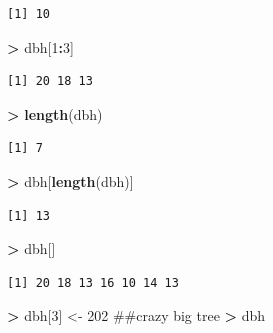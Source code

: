 \documentclass[]{krantz}
\makeatletter
\newenvironment{Shaded}{\begin{snugshade}}{\end{snugshade}}
\newcommand{\KeywordTok}[1]{\textcolor[rgb]{0.27,0.27,0.27}{\textbf{#1}}}
\newcommand{\DecValTok}[1]{\textcolor[rgb]{0.06,0.06,0.06}{#1}}
\newcommand{\StringTok}[1]{\textcolor[rgb]{0.5,0.5,0.5}{#1}}
\newcommand{\OperatorTok}[1]{\textcolor[rgb]{0.43,0.43,0.43}{\textbf{#1}}}
\newcommand{\NormalTok}[1]{#1}
\newenvironment{kframe}{%
\medskip{}
\setlength{\fboxsep}{.8em}
 \def\at@end@of@kframe{}%
 \ifinner\ifhmode%
  \def\at@end@of@kframe{\end{minipage}}%
  \begin{minipage}{\columnwidth}%
 \fi\fi%
 \def\FrameCommand##1{\hskip\@totalleftmargin \hskip-\fboxsep
 \colorbox{shadecolor}{##1}\hskip-\fboxsep
     \hskip-\linewidth \hskip-\@totalleftmargin \hskip\columnwidth}%
 \MakeFramed {\advance\hsize-\width
   \@totalleftmargin\z@ \linewidth\hsize
   \@setminipage}}%
 {\par\unskip\endMakeFramed%
 \at@end@of@kframe}
\renewenvironment{Shaded}{\begin{kframe}}{\end{kframe}}
\theoremstyle{definition}
\theoremstyle{definition}
\theoremstyle{definition}
\theoremstyle{remark}
\makeatother
\begin{document}
\begin{verbatim}
[1] 10
\end{verbatim}

\begin{Shaded}
\begin{Highlighting}[]
\OperatorTok{>}\StringTok{ }\NormalTok{dbh[}\DecValTok{1}\OperatorTok{:}\DecValTok{3}\NormalTok{]}
\end{Highlighting}
\end{Shaded}

\begin{verbatim}
[1] 20 18 13
\end{verbatim}

\begin{Shaded}
\begin{Highlighting}[]
\OperatorTok{>}\StringTok{ }\KeywordTok{length}\NormalTok{(dbh)}
\end{Highlighting}
\end{Shaded}

\begin{verbatim}
[1] 7
\end{verbatim}

\begin{Shaded}
\begin{Highlighting}[]
\OperatorTok{>}\StringTok{ }\NormalTok{dbh[}\KeywordTok{length}\NormalTok{(dbh)]}
\end{Highlighting}
\end{Shaded}

\begin{verbatim}
[1] 13
\end{verbatim}

\begin{Shaded}
\begin{Highlighting}[]
\OperatorTok{>}\StringTok{ }\NormalTok{dbh[]}
\end{Highlighting}
\end{Shaded}

\begin{verbatim}
[1] 20 18 13 16 10 14 13
\end{verbatim}

\begin{Shaded}
\begin{Highlighting}[]
\OperatorTok{>}\StringTok{ }\NormalTok{dbh[}\DecValTok{3}\NormalTok{] <-}\StringTok{ }\DecValTok{202}\NormalTok{  ##crazy big tree}
\OperatorTok{>}\StringTok{ }\NormalTok{dbh}
\end{Highlighting}
\end{Shaded}
\end{document}
